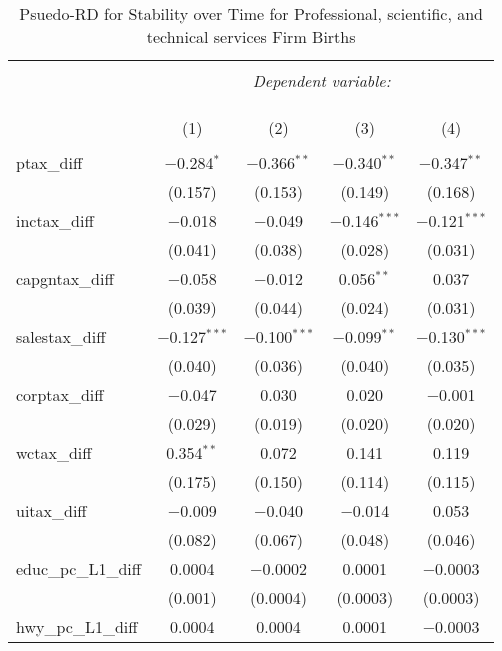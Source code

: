 
\begin{table}[!htbp] \centering 
  \caption{Psuedo-RD for Stability over Time for  Professional, scientific, and technical services Firm Births} 
  \label{} 
\begin{tabular}{@{\extracolsep{5pt}}lcccc} 
\\[-1.8ex]\hline 
\hline \\[-1.8ex] 
 & \multicolumn{4}{c}{\textit{Dependent variable:}} \\ 
\cline{2-5} 
\\[-1.8ex] & \multicolumn{4}{c}{ } \\ 
\\[-1.8ex] & (1) & (2) & (3) & (4)\\ 
\hline \\[-1.8ex] 
 ptax\_diff & $-$0.284$^{*}$ & $-$0.366$^{**}$ & $-$0.340$^{**}$ & $-$0.347$^{**}$ \\ 
  & (0.157) & (0.153) & (0.149) & (0.168) \\ 
  inctax\_diff & $-$0.018 & $-$0.049 & $-$0.146$^{***}$ & $-$0.121$^{***}$ \\ 
  & (0.041) & (0.038) & (0.028) & (0.031) \\ 
  capgntax\_diff & $-$0.058 & $-$0.012 & 0.056$^{**}$ & 0.037 \\ 
  & (0.039) & (0.044) & (0.024) & (0.031) \\ 
  salestax\_diff & $-$0.127$^{***}$ & $-$0.100$^{***}$ & $-$0.099$^{**}$ & $-$0.130$^{***}$ \\ 
  & (0.040) & (0.036) & (0.040) & (0.035) \\ 
  corptax\_diff & $-$0.047 & 0.030 & 0.020 & $-$0.001 \\ 
  & (0.029) & (0.019) & (0.020) & (0.020) \\ 
  wctax\_diff & 0.354$^{**}$ & 0.072 & 0.141 & 0.119 \\ 
  & (0.175) & (0.150) & (0.114) & (0.115) \\ 
  uitax\_diff & $-$0.009 & $-$0.040 & $-$0.014 & 0.053 \\ 
  & (0.082) & (0.067) & (0.048) & (0.046) \\ 
  educ\_pc\_L1\_diff & 0.0004 & $-$0.0002 & 0.0001 & $-$0.0003 \\ 
  & (0.001) & (0.0004) & (0.0003) & (0.0003) \\ 
  hwy\_pc\_L1\_diff & 0.0004 & 0.0004 & 0.0001 & $-$0.0003 \\ 

\end{tabular}
\end{table}
